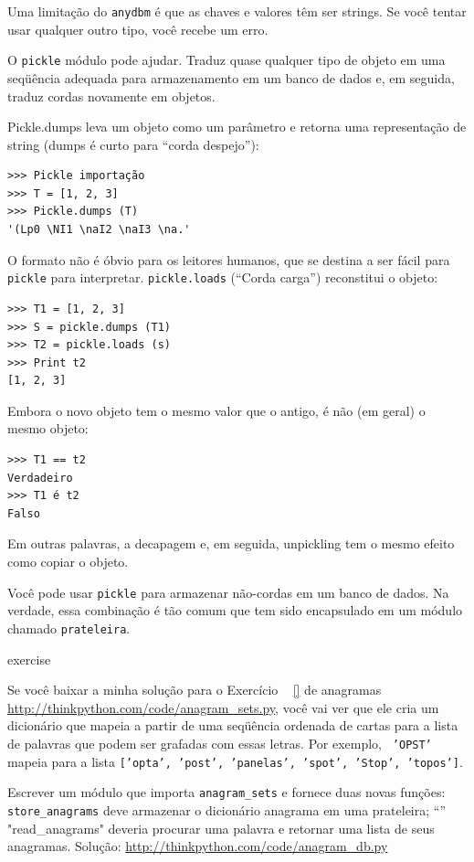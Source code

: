 \documentclass[10pt]{book}
\begin{document}
\begin{exercise}
\begin{v erbatim}
Uma limitação do {\tt anydbm} é que as chaves e valores têm
ser strings. Se você tentar usar qualquer outro tipo, você recebe um
erro.

O {\tt pickle} módulo pode ajudar. Traduz
quase qualquer tipo de objeto em uma seqüência adequada para armazenamento em um
banco de dados e, em seguida, traduz cordas novamente em objetos.

{Pickle.dumps \tt} leva um objeto como um parâmetro e retorna
uma representação de string ({dumps \tt} é curto para ``corda despejo''):

\begin{verbatim}
>>> Pickle importação
>>> T = [1, 2, 3]
>>> Pickle.dumps (T)
'(Lp0 \NI1 \naI2 \naI3 \na.'
\end{verbatim}
%
O formato não é óbvio para os leitores humanos, que se destina a ser
fácil para {\tt pickle} para interpretar. {\tt pickle.loads}
(``Corda carga'') reconstitui o objeto:

\begin{verbatim}
>>> T1 = [1, 2, 3]
>>> S = pickle.dumps (T1)
>>> T2 = pickle.loads (s)
>>> Print t2
[1, 2, 3]
\end{verbatim}
%
Embora o novo objeto tem o mesmo valor que o antigo, é
não (em geral) o mesmo objeto:

\begin{verbatim}
>>> T1 == t2
Verdadeiro
>>> T1 é t2
Falso
\end{verbatim}
%
Em outras palavras, a decapagem e, em seguida, unpickling tem o mesmo efeito
como copiar o objeto.

Você pode usar {\tt pickle} para armazenar não-cordas em um banco de dados.
Na verdade, essa combinação é tão comum que tem sido
encapsulado em um módulo chamado {\tt prateleira}.  


\begin{} exercise

Se você baixar a minha solução para o Exercício ~ \ref {} de anagramas
\url{http://thinkpython.com/code/anagram_sets.py}, você vai ver que ele cria
um dicionário que mapeia a partir de uma seqüência ordenada de cartas para a lista de
palavras que podem ser grafadas com essas letras. Por exemplo, {\tt
  'OPST'} mapeia para a lista {\tt ['opta', 'post', 'panelas', 'spot',
    'Stop', 'topos']}.

Escrever um módulo que importa \verb "anagram_sets" e fornece
duas novas funções: \verb "store_anagrams" deve armazenar o
dicionário anagrama em uma prateleira; ``'' \verbo "read_anagrams" deveria
procurar uma palavra e retornar uma lista de seus anagramas.
Solução: \url{http://thinkpython.com/code/anagram_db.py}


\end{}
\end{v erbatim}
\end{exercise}
\end{document}
